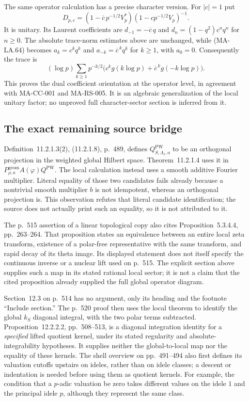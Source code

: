 The same operator calculation has a precise character version.
For $|c|=1$ put
\[
 D_{p,c}=(1-\overline c\,p^{-1/2}V_p^*)
                         (1-cp^{-1/2}V_p)^{-1}.
 \tag{MA-LA.65}
\]
It is unitary.  Its Laurent coefficients are
$d_{-1}=-\overline c\,q$ and
$d_n=(1-q^2)c^nq^n$ for $n\ge0$.
The absolute trace-norm estimates above are unchanged, while
(MA-LA.64) becomes $a_k=c^kq^k$ and
$a_{-k}=\overline c^{\,k}q^k$ for $k\ge1$, with $a_0=0$.
Consequently the trace is
\[
 (\log p)\sum_{k\ge1}p^{-k/2}
       \bigl(c^kg(k\log p)+\overline c^{\,k}g(-k\log p)\bigr).
 \tag{MA-LA.66}
\]
This proves the dual coefficient orientation at the operator
level, in agreement with MA-CC-001 and MA-RS-005.
It is an algebraic generalization of the local unitary factor;
no unproved full character-sector section is inferred from it.

\subsection{The exact remaining source bridge}

Definition~11.2.1.3(2), (11.2.1.8), p.~489, defines
$Q^{\mathrm{PW}}_{S,\Lambda_1,a}$ to be an orthogonal
projection in the weighted global Hilbert space.  Theorem~11.2.1.4
uses it in $P^{\mathrm{geom}}_{\rho,a}A(\varphi)Q^{\mathrm{PW}}$.
The local calculation instead uses a smooth additive Fourier
multiplier.  Literal equality of those two candidates fails
already because a nontrivial smooth multiplier $b$ is not
idempotent, whereas an orthogonal projection is.  This observation
refutes that literal candidate identification; the source does
not actually print such an equality, so it is not attributed to it.

The p.~515 assertion of a linear topological copy also cites
Proposition~5.3.4.4, pp.~263--264.  That proposition states an
equivalence between an entire local zeta transform, existence
of a polar-free representative with the same transform, and
rapid decay of its theta image.  Its displayed statement does
not itself specify the continuous inverse or a nuclear lift
used on p.~515.  The explicit section above supplies such
a map in its stated rational local sector; it is not a claim
that the cited proposition already supplied the full global
operator diagram.

Section~12.3 on p.~514 has no argument, only its heading and
the footnote ``Include section.''  The p.~520 proof then uses
the local theorem to identify the global $k_S$ diagonal integral,
with the two polar terms subtracted.  Proposition~12.2.2.2,
pp.~508--513, is a diagonal integration identity for a
\emph{specified} lifted quotient kernel, under its stated
regularity and absolute-integrability hypotheses.  It supplies
neither the global-to-local map nor the equality of these kernels.
The shell overview on pp.~491--494 also first defines its
valuation cutoffs upstairs on ideles, rather than on idele
classes; a descent or indentation is needed before using them
as quotient kernels.  For example, the condition that a $p$-adic
valuation be zero takes different values on the idele $1$ and
the principal idele $p$, although they represent the same class.


